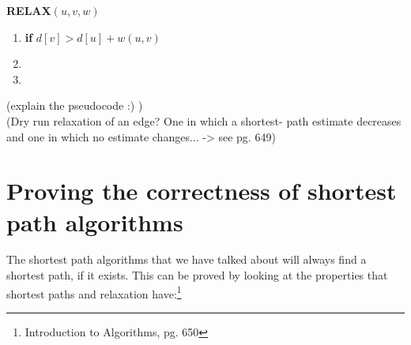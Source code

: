 \documentclass[11pt]{article}
\begin{document}
\textbf{RELAX$(u, v, w)$}
\begin{enumerate}
\setlength\itemsep{0em}
\item \textbf{if } $d[v] > d[u] + w(u,v)$
\item {}
\item {}
\end{enumerate}
(explain the pseudocode :) )\\

\noindent
(Dry run relaxation of an edge? One in which a shortest- path estimate decreases and one in which no estimate changes... -> see pg. 649)\\

\section{Proving the correctness of shortest path algorithms}
The shortest path algorithms that we have talked about will always find a shortest path, if it exists. This can be proved by looking at the properties that shortest paths and relaxation have:\footnote{Introduction to Algorithms, pg. 650}
\end{document}
